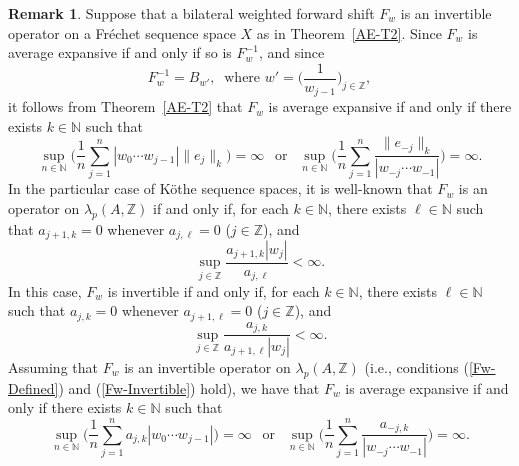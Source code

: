 \documentclass[12pt]{amsart}
\theoremstyle{theorem}
\theoremstyle{definition}
\newtheorem{remark}[theorem]{Remark}
\theoremstyle{remark} \theoremstyle{question} \theoremstyle{example}
\newcommand{\N}{\mathbb{N}}   %
\newcommand{\Z}{\mathbb{Z}}   %
\begin{document}
\begin{remark}\label{AE-R1}
Suppose that a bilateral weighted forward shift $F_w$ is an invertible operator on a Fr\'echet sequence space $X$ 
as in Theorem~\ref{AE-T2}. Since $F_w$ is average expansive if and only if so is $F_w^{-1}$, and since
\[
F_w^{-1} = B_{w'}, \ \text{ where } w' = \Big(\frac{1}{w_{j-1}}\Big)_{j \in \Z},
\]
it follows from Theorem~\ref{AE-T2} that $F_w$ is average expansive if and only if there exists $k \in \N$ such that
\begin{equation}\label{AE-F4}
\sup_{n \in \N} \Big(\frac{1}{n} \sum_{j=1}^n |w_0 \cdots w_{j-1}| \|e_j\|_k\Big) = \infty \ \ \text{ or } \ \
\sup_{n \in \N} \Big(\frac{1}{n} \sum_{j=1}^n \frac{\|e_{-j}\|_k}{|w_{-j} \cdots w_{-1}|}\Big) = \infty.
\end{equation}
In the particular case of K\"othe sequence spaces, it is well-known that $F_w$ is an operator on $\lambda_p(A,\Z)$ if and only if, 
for each $k \in \N$, there exists $\ell \in \N$ such that $a_{j+1,k} = 0$ whenever $a_{j,\ell} = 0$ ($j \in \Z$), and  
\begin{equation}\label{Fw-Defined}
\sup_{j \in \Z} \frac{a_{j+1,k} |w_j|}{a_{j,\ell}} < \infty.
\end{equation}
In this case, $F_w$ is invertible if and only if, for each $k \in \N$, there exists $\ell \in \N$ such that 
$a_{j,k} = 0$ whenever $a_{j+1,\ell} = 0$ ($j \in \Z$), and  
\begin{equation}\label{Fw-Invertible}
\sup_{j \in \Z} \frac{a_{j,k}}{a_{j+1,\ell} |w_j|} < \infty.
\end{equation}
Assuming that $F_w$ is an invertible operator on $\lambda_p(A,\Z)$ (i.e., conditions (\ref{Fw-Defined}) and (\ref{Fw-Invertible}) hold), 
we have that $F_w$ is average expansive if and only if there exists $k \in \N$ such that
\begin{equation}\label{AE-F5}
\sup_{n \in \N} \Big(\frac{1}{n} \sum_{j=1}^n a_{j,k} |w_0 \cdots w_{j-1}|\Big) = \infty \ \ \text{ or } \ \
\sup_{n \in \N} \Big(\frac{1}{n} \sum_{j=1}^n \frac{a_{-j,k}}{|w_{-j} \cdots w_{-1}|}\Big) = \infty.
\end{equation}
\end{remark}
\end{document}
